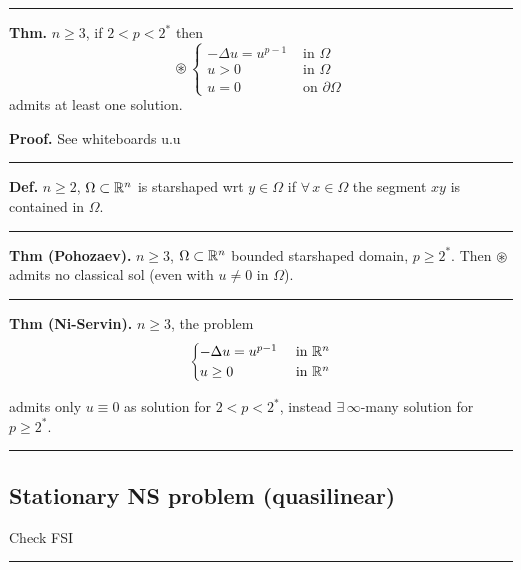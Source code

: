 \rule{0.31\textwidth}{0.2pt}
\smallskip

\textbf{Thm.} $n\geq 3$, if $2< p < 2^*$ then
\begin{equation*}
\circledast\,
\begin{cases}
    -\Delta u = u^{p-1} &\text{ in }\Omega\\
    u >0 &\text{ in }\Omega\\
    u=0 &\text{ on }\partial\Omega    
\end{cases}
\end{equation*}
admits at least one solution.

\smallskip

\textbf{\color{lavender(floral)}Proof.} See whiteboards u.u

\rule{0.31\textwidth}{0.2pt}
\smallskip

\textbf{Def.} $n\geq 2$, $\Omega\subset\mathbb{R}^n$ is starshaped wrt $y\in\Omega$ if $\forall\, x \in\Omega$ the segment $xy$ is contained in $\Omega$.

\rule{0.31\textwidth}{0.2pt}
\smallskip

\textbf{Thm (Pohozaev).} $n\geq 3$, $\Omega\subset\mathbb{R}^n$ bounded starshaped domain, $p\geq 2^*$. Then $\circledast$ admits no classical sol (even with $u\neq 0$ in $\Omega$).

\rule{0.31\textwidth}{0.2pt}
\smallskip

\textbf{Thm (Ni-Servin).} $n\geq 3$, the problem
\begin{equation*}
\begin{cases}
    -\Delta u = u^{p-1} &\text{ in }\mathbb{R}^n\\
    u \geq 0 &\text{ in }\mathbb{R}^n  
\end{cases}
\end{equation*}

admits only $u\equiv 0$ as solution for $2<p<2^*$, instead $\exists\,\infty$-many solution for $p\geq 2^*$.

\rule{0.31\textwidth}{0.2pt}


\subsection{\texorpdfstring{\color{red}Stationary NS problem (quasilinear)}{}}


Check FSI

\rule{0.31\textwidth}{1pt}










